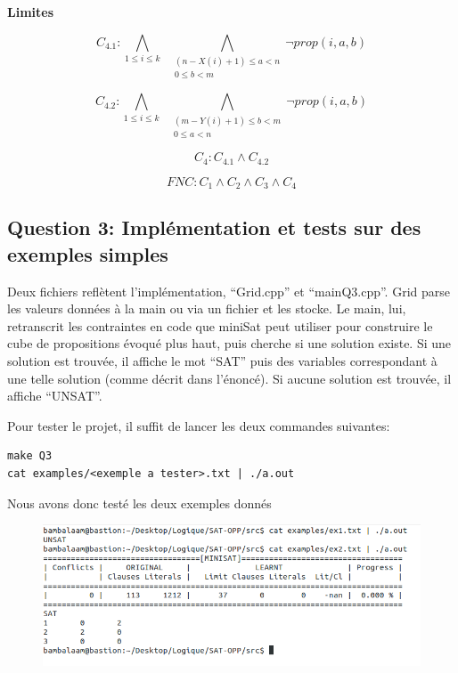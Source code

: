 \documentclass[a4paper,10pt]{article}
\begin{document}
\textbf{Limites}

$$C_{4.1} : \bigwedge_{1 \leq i \leq k} \;\; \bigwedge_{\substack{(n-X(i)+1) \leq a < n \\ 0 \leq b < m}} \neg prop(i,a,b)$$

$$C_{4.2} : \bigwedge_{1 \leq i \leq k} \;\; \bigwedge_{\substack{(m-Y(i)+1) \leq b < m \\ 0 \leq a < n}} \neg prop(i,a,b)$$

\begin{center}
$$C_4: C_{4.1} \wedge C_{4.2}$$
\end{center}


\begin{center}
$$FNC: C_1 \wedge C_2 \wedge C_3 \wedge C_4$$
\end{center}

\newpage

\subsection{Question 3: Implémentation et tests sur des exemples simples}

Deux fichiers reflètent l'implémentation, ``Grid.cpp'' et ``mainQ3.cpp''. Grid parse les valeurs données à la main ou via un fichier et les stocke. Le main, lui, retranscrit les contraintes en code que miniSat peut utiliser pour construire le cube de propositions évoqué plus haut, puis cherche si une solution existe. Si une solution est trouvée, il affiche le mot ``SAT'' puis des variables correspondant à une telle solution (comme décrit dans l'énoncé). Si aucune solution est trouvée, il affiche ``UNSAT''.

Pour tester le projet, il suffit de lancer les deux commandes suivantes:

\begin{lstlisting}
make Q3
cat examples/<exemple a tester>.txt | ./a.out
\end{lstlisting}

Nous avons donc testé les deux exemples donnés 
\begin{figure}[htb!]
\centering
\includegraphics[scale=0.5]{SAT-Simple}
\end{figure}
\end{document}
